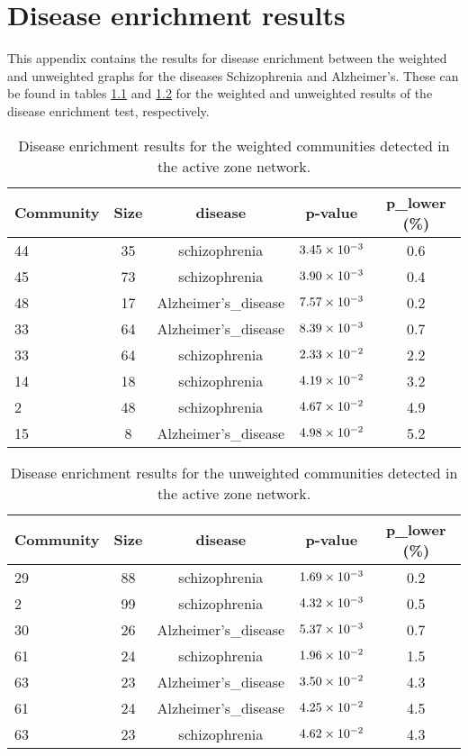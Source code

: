 \chapter{Disease enrichment results}

This appendix contains the results for disease enrichment between the weighted and unweighted graphs for the diseases Schizophrenia and Alzheimer's.
These can be found in tables \ref{tab:wdisease} and \ref{tab:uwdisease} for the weighted and unweighted results of the disease enrichment test, respectively.

\begin{table}
    \centering
    \begin{tabular}{l c c c c}
        \small
        Community & Size & disease & p-value & p_lower (\%) \\ 
        \hline
        44 & 35 & schizophrenia & $3.45\times 10^{-3}$ & 0.6 \\ 
        45 & 73 & schizophrenia & $3.90\times 10^{-3}$ & 0.4 \\ 
        48 & 17 & Alzheimer's_disease & $7.57\times 10^{-3}$ & 0.2 \\ 
        33 & 64 & Alzheimer's_disease & $8.39\times 10^{-3}$ & 0.7 \\ 
        33 & 64 & schizophrenia & $2.33\times 10^{-2}$ & 2.2 \\ 
        14 & 18 & schizophrenia & $4.19\times 10^{-2}$ & 3.2 \\ 
        2 & 48 & schizophrenia & $4.67\times 10^{-2}$ & 4.9 \\ 
        15 & 8 & Alzheimer's_disease & $4.98\times 10^{-2}$ & 5.2 \\ 
    \end{tabular}
    \caption{Disease enrichment results for the weighted communities detected in the active zone network.}
    \label{tab:wdisease}
\end{table}
    

\begin{table}
    \centering
    \begin{tabular}{l c c c c }
        \small
        Community & Size & disease & p-value & p_lower (\%) \\ 
        \hline
        29 & 88 & schizophrenia & $1.69\times 10^{-3}$ & 0.2 \\ 
        2 & 99 & schizophrenia & $4.32\times 10^{-3}$ & 0.5 \\ 
        30 & 26 & Alzheimer's_disease & $5.37\times 10^{-3}$ & 0.7 \\ 
        61 & 24 & schizophrenia & $1.96\times 10^{-2}$ & 1.5 \\ 
        63 & 23 & Alzheimer's_disease & $3.50\times 10^{-2}$ & 4.3 \\ 
        61 & 24 & Alzheimer's_disease & $4.25\times 10^{-2}$ & 4.5 \\ 
        63 & 23 & schizophrenia & $4.62\times 10^{-2}$ & 4.3 \\ 
    \end{tabular}
    \caption{Disease enrichment results for the unweighted communities detected in the active zone network.}
    \label{tab:uwdisease}
\end{table}


